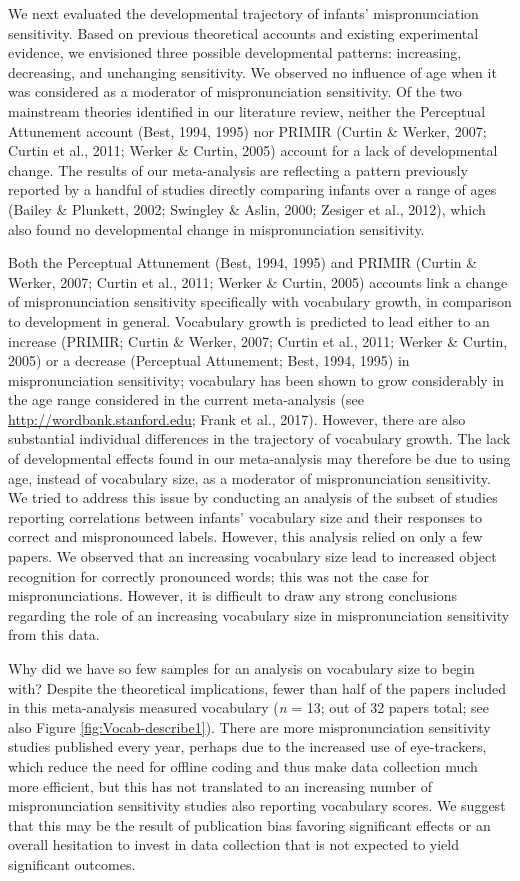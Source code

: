 \documentclass[man]{apa6}
\theoremstyle{definition}
\theoremstyle{definition}
\theoremstyle{definition}
\theoremstyle{remark}
\begin{document}
We next evaluated the developmental trajectory of infants'
mispronunciation sensitivity. Based on previous theoretical accounts and
existing experimental evidence, we envisioned three possible
developmental patterns: increasing, decreasing, and unchanging
sensitivity. We observed no influence of age when it was considered as a
moderator of mispronunciation sensitivity. Of the two mainstream
theories identified in our literature review, neither the Perceptual
Attunement account (Best, 1994, 1995) nor PRIMIR (Curtin \& Werker,
2007; Curtin et al., 2011; Werker \& Curtin, 2005) account for a lack of
developmental change. The results of our meta-analysis are reflecting a
pattern previously reported by a handful of studies directly comparing
infants over a range of ages (Bailey \& Plunkett, 2002; Swingley \&
Aslin, 2000; Zesiger et al., 2012), which also found no developmental
change in mispronunciation sensitivity.

Both the Perceptual Attunement (Best, 1994, 1995) and PRIMIR (Curtin \&
Werker, 2007; Curtin et al., 2011; Werker \& Curtin, 2005) accounts link
a change of mispronunciation sensitivity specifically with vocabulary
growth, in comparison to development in general. Vocabulary growth is
predicted to lead either to an increase (PRIMIR; Curtin \& Werker, 2007;
Curtin et al., 2011; Werker \& Curtin, 2005) or a decrease (Perceptual
Attunement; Best, 1994, 1995) in mispronunciation sensitivity;
vocabulary has been shown to grow considerably in the age range
considered in the current meta-analysis (see
\url{http://wordbank.stanford.edu}; Frank et al., 2017). However, there
are also substantial individual differences in the trajectory of
vocabulary growth. The lack of developmental effects found in our
meta-analysis may therefore be due to using age, instead of vocabulary
size, as a moderator of mispronunciation sensitivity. We tried to
address this issue by conducting an analysis of the subset of studies
reporting correlations between infants' vocabulary size and their
responses to correct and mispronounced labels. However, this analysis
relied on only a few papers. We observed that an increasing vocabulary
size lead to increased object recognition for correctly pronounced
words; this was not the case for mispronunciations. However, it is
difficult to draw any strong conclusions regarding the role of an
increasing vocabulary size in mispronunciation sensitivity from this
data.

Why did we have so few samples for an analysis on vocabulary size to
begin with? Despite the theoretical implications, fewer than half of the
papers included in this meta-analysis measured vocabulary (\emph{n} =
13; out of 32 papers total; see also Figure \ref{fig:Vocab-describe1}).
There are more mispronunciation sensitivity studies published every
year, perhaps due to the increased use of eye-trackers, which reduce the
need for offline coding and thus make data collection much more
efficient, but this has not translated to an increasing number of
mispronunciation sensitivity studies also reporting vocabulary scores.
We suggest that this may be the result of publication bias favoring
significant effects or an overall hesitation to invest in data
collection that is not expected to yield significant outcomes.
\end{document}
